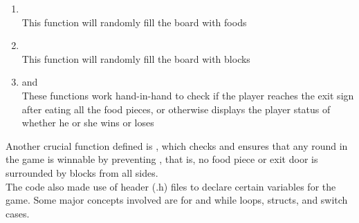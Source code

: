 \begin{enumerate}
    \item {}\\
    \hspace{1em} This function will randomly fill the board with foods
    \item {}\\
    \hspace{1em} This function will randomly fill the board with blocks
    \item {} and \\
    \hspace{1em} These functions work hand-in-hand to check if the player reaches the exit sign after eating all the food pieces,
    or otherwise displays the player status of whether he or she wins or loses
\end{enumerate}

Another crucial function defined is , which checks and ensures that any round in the game is winnable by preventing , that is, no food piece or exit door is surrounded by blocks from all sides.\\

The code also made use of header (.h) files to declare certain variables for the game. Some major concepts involved are for and while loops, structs, and switch cases.